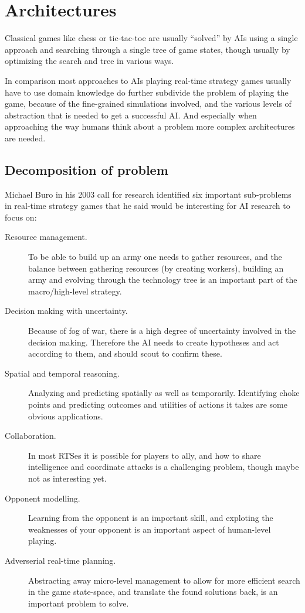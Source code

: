 
\section{Architectures}
Classical games like chess or tic-tac-toe are usually ``solved'' by AIs using a
single approach and searching through a single tree of game states, though
usually by optimizing the search and tree in various ways.

In comparison most approaches to AIs playing real-time strategy games usually
have to use domain knowledge do further subdivide the problem of playing the
game, because of the fine-grained simulations involved, and the various levels
of abstraction that is needed to get a successful AI. And especially when
approaching the way humans think about a problem more complex architectures
are needed.

\subsection{Decomposition of problem}
Michael Buro in his 2003 call for research \cite{buro2003real} identified six
important sub-problems in real-time strategy games that he said would be
interesting for AI research to focus on:

\begin{description}
  \item [Resource management.] To be able to build up an army one needs to gather
    resources, and the balance between gathering resources (by creating workers),
    building an army and evolving through the technology tree is an important
    part of the macro/high-level strategy.
  \item [Decision making with uncertainty.] Because of fog of war, there is a
    high degree of uncertainty involved in the decision making. Therefore the AI
    needs to create hypotheses and act according to them, and should scout to
    confirm these.
  \item [Spatial and temporal reasoning.] Analyzing and predicting spatially as
    well as temporarily. Identifying choke points and predicting outcomes and
    utilities of actions it takes are some obvious applications.
  \item [Collaboration.] In most RTSes it is possible for players to ally, and
    how to share intelligence and coordinate attacks is a challenging problem,
    though maybe not as interesting yet.
  \item [Opponent modelling.] Learning from the opponent is an important skill,
    and exploting the weaknesses of your opponent is an important aspect of
    human-level playing.
  \item [Adverserial real-time planning.] Abstracting away micro-level
    management to allow for more efficient search in the game state-space, and
    translate the found solutions back, is an important problem to solve.
\end{description}

